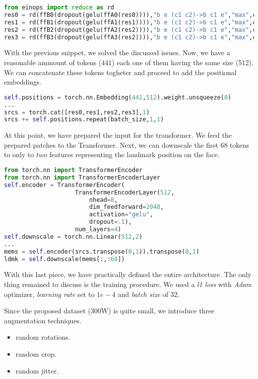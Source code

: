 \begin{lstlisting}[language=Python]
from einops import reduce as rd
res0 = rd(ffB0(dropout(gelu(ffA0(res0)))),"b e (c1 c2)->b c1 e","max",c2=16)
res1 = rd(ffB1(dropout(gelu(ffA1(res1)))),"b e (c1 c2)->b c1 e","max",c2=8)
res2 = rd(ffB2(dropout(gelu(ffA2(res2)))),"b e (c1 c2)->b c1 e","max",c2=4)
res3 = rd(ffB3(dropout(gelu(ffA3(res2)))),"b e (c1 c2)->b c1 e","max",c2=1)
\end{lstlisting}

With the previous snippet, we solved the discussed issues. Now, we have a reasonable ammount of tokens (441) each one of them having the same size (512). We can concatenate these tokens togheter and proceed to add the positional embeddings.

\begin{lstlisting}[language=Python]
self.positions = torch.nn.Embedding(441,512).weight.unsqueeze(0)
...
srcs = torch.cat([res0,res1,res2,res3],1) 
srcs += self.positions.repeat(batch_size,1,1)
\end{lstlisting}

At this point, we have prepared the input for the transformer. We feed the prepared patches to the Transformer. Next, we can downscale the first $68$ tokens to only to $two$ features representing the landmark position on the face.

\begin{lstlisting}[language=Python]
from torch.nn import TransformerEncoder
from torch.nn import TransformerEncoderLayer
self.encoder = TransformerEncoder(
                    TransformerEncoderLayer(512,
                        nhead=8,
                        dim_feedforward=2048,
                        activation="gelu",
                        dropout=.1),
                    num_layers=4)
self.downscale = torch.nn.Linear(512,2)
...
mems = self.encoder(srcs.transpose(0,1)).transpose(0,1)
ldmk = self.downscale(mems[:,:68])
\end{lstlisting}

With this last piece, we have practically defined the entire architecture. The only thing remained to discuss is the training procedure. We used a \textit{l1 loss} with \textit{Adam} optimizer, \textit{learning rate} set to $1e-4$ and \textit{batch size} of $32$.

Since the proposed dataset (300W) is quite small, we introduce three augmentation techniques. 
\begin{itemize}
    \item random rotations.
    \item random crop.
    \item random jitter.
\end{itemize}

